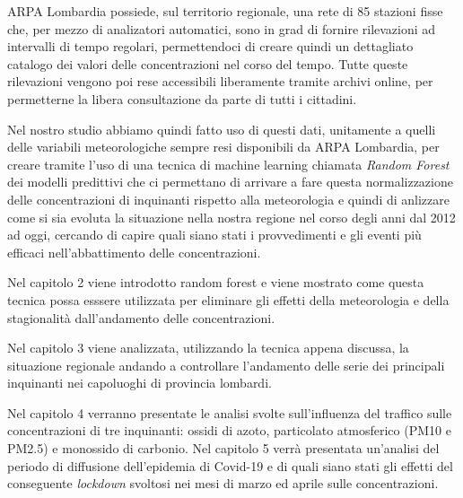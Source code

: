 \documentclass[a4paper]{report}
\begin{document}
ARPA Lombardia possiede, sul territorio regionale, una rete di 85 stazioni fisse che, per mezzo di analizatori automatici, sono in grad di fornire rilevazioni ad intervalli di tempo regolari, permettendoci di creare quindi un dettagliato catalogo dei valori delle concentrazioni nel corso del tempo. Tutte queste rilevazioni vengono poi rese accessibili liberamente tramite archivi online, per permetterne la libera consultazione da parte di tutti i cittadini.  

Nel nostro studio abbiamo quindi fatto uso di questi dati, unitamente a quelli delle variabili meteorologiche sempre resi disponibili da ARPA Lombardia, per creare tramite l'uso di una tecnica di machine learning chiamata \textit{Random Forest}
 dei modelli predittivi che ci permettano di arrivare a fare questa normalizzazione delle concentrazioni di inquinanti rispetto alla meteorologia e quindi di anlizzare come si sia evoluta la situazione nella nostra regione nel corso degli anni dal 2012 ad oggi, cercando di capire quali siano stati i provvedimenti e gli eventi più efficaci nell'abbattimento delle concentrazioni.  

Nel capitolo 2 viene introdotto random forest e viene mostrato come questa tecnica possa esssere utilizzata per eliminare gli effetti della meteorologia e della stagionalità dall'andamento delle concentrazioni.  

Nel capitolo 3 viene analizzata, utilizzando la tecnica appena discussa, la situazione regionale andando a controllare l'andamento delle serie dei principali inquinanti nei capoluoghi di provincia lombardi.  

Nel capitolo 4 verranno presentate le analisi svolte sull'influenza del traffico sulle concentrazioni di tre inquinanti: ossidi di azoto, particolato atmosferico (PM10 e PM2.5) e monossido di carbonio.
Nel capitolo 5 verrà presentata un'analisi del periodo di diffusione dell'epidemia di Covid-19 e di quali siano stati gli effetti del conseguente \textit{lockdown} svoltosi nei mesi di marzo ed aprile sulle concentrazioni.

\end{document}
